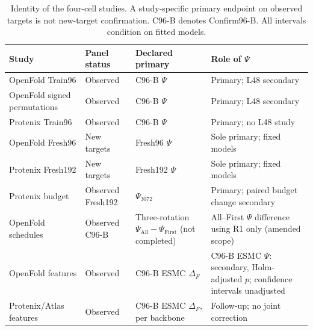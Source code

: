 \begin{table}[t]\centering\footnotesize
\caption{Identity of the four-cell studies. A study-specific primary
endpoint on observed targets is not new-target confirmation. C96-B denotes
Confirm96-B. All intervals condition on fitted models.}
\label{tab:study_roles}
\begin{tabular}{p{.22\linewidth}p{.13\linewidth}p{.25\linewidth}p{.27\linewidth}}\toprule
Study & Panel status & Declared primary & Role of $\Psi$ \\\midrule
OpenFold Train96 & Observed & C96-B $\Psi$ & Primary; L48 secondary \\
OpenFold signed permutations & Observed & C96-B $\Psi$ & Primary; L48 secondary \\
Protenix Train96 & Observed & C96-B $\Psi$ & Primary; no L48 study \\
OpenFold Fresh96 & New targets & Fresh96 $\Psi$ & Sole primary; fixed models \\
Protenix Fresh192 & New targets & Fresh192 $\Psi$ & Sole primary; fixed models \\
Protenix budget & Observed Fresh192 & $\Psi_{3072}$ & Primary; paired budget change secondary \\
OpenFold schedules & Observed C96-B & Three-rotation $\Psi_{\mathrm{All}}-\Psi_{\mathrm{First}}$ (not completed) & All--First $\Psi$ difference using R1 only (amended scope) \\
OpenFold features & Observed & C96-B ESMC $\Delta_F$ & C96-B ESMC $\Psi$: secondary, Holm-adjusted $p$; confidence intervals unadjusted \\
Protenix/Atlas features & Observed & C96-B ESMC $\Delta_F$, per backbone & Follow-up; no joint correction \\\bottomrule
\end{tabular}\end{table}
